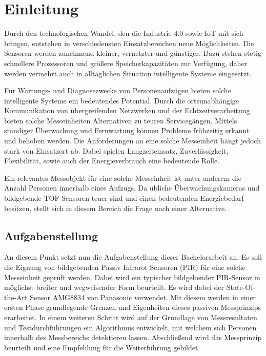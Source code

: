 \chapter{Einleitung}
\label{chap:Einleitung}


\label{sec:Ausgangssituation}
Durch den technologischen Wandel, den die Industrie 4.0 sowie \ac{IoT}  mit sich bringen, entstehen in verschiedensten Einsatzbereichen neue Möglichkeiten. Die Sensoren werden zunehmend kleiner, vernetzter und günstiger. Dazu stehen stetig schnellere Prozessoren und größere Speicherkapazitäten zur Verfügung, daher werden vermehrt auch in alltäglichen Situation intelligente Systeme eingesetzt. 

Für Wartungs- und Diagnosezwecke von Personenaufzügen bieten solche intelligente Systeme ein bedeutendes Potential. Durch die ortsunabhängige Kommunikation von übergreifenden Netzwerken und der Echtzeitverarbeitung bieten solche Messeinheiten Alternativen zu teuren Servicegängen. Mittels ständiger Überwachung und Fernwartung können Probleme frühzeitig erkannt und behoben werden. Die Anforderungen an eine solche Messeinheit hängt jedoch stark von Einsatzort ab. Dabei spielen Langzeiteinsatz, Zuverlässigkeit, Flexibilität, sowie auch der Energieverbrauch eine bedeutende Rolle.

Ein relevantes Messobjekt für eine solche Messeinheit ist unter anderem die Anzahl Personen innerhalb eines Aufzugs. Da übliche Überwachungskameras und bildgebende TOF-Sensoren teuer sind und einen bedeutenden Energiebedarf besitzen, stellt sich in diesem Bereich die Frage nach einer Alternative.

\section{Aufgabenstellung}
\label{chap:Aufgabenstellung}

An diesem Punkt setzt nun die Aufgabenstellung dieser Bachelorarbeit an. Es soll die Eignung von bildgebenden Passiv Infrarot Sensoren (PIR) für eine solche Messeinheit geprüft werden. Dabei wird ein typischer bildgebender PIR-Sensor in möglichst breiter und wegweisender Form beurteilt. Es wird dabei der State-Of-the-Art Sensor AMG8834 von Panasonic verwendet. Mit diesem werden in einer ersten Phase grundlegende Grenzen und Eigenheiten dieses passiven Messprinzips erarbeitet. In einem weiteren Schritt wird auf der Grundlage von Messresultaten und Testdurchführungen ein Algorithmus entwickelt, mit welchem sich Personen innerhalb des Messbereichs detektieren lassen. Abschließend wird das Messprinzip beurteilt und eine Empfehlung für die Weiterführung gebildet. 
